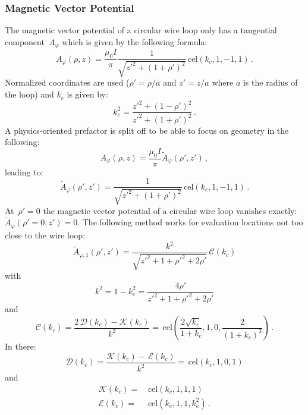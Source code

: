 \subsubsection{Magnetic Vector Potential}
The magnetic vector potential of a circular wire loop
only has a tangential component~$A_\varphi$
which is given by the following formula:
\begin{equation}
  A_\varphi(\rho, z)
  = \frac{\mu_0 I}{\pi} \frac{1}{\sqrt{z'^2 + (1 + \rho')^2}}
    \,\mathrm{cel}(k_c, 1, -1, 1) \, .
\end{equation}
Normalized coordinates are used ($\rho' = \rho/a$ and $z' = z/a$ where $a$ is the radius of the loop)
and $k_c$ is given by:
\begin{equation}
  k_c^2 = \frac{z'^2 + (1 - \rho')^2}{z'^2 + (1 + \rho')^2} \, .
\end{equation}
A physics-oriented prefactor is split off to be able to focus on geometry in the following:
\begin{equation}
  A_\varphi(\rho, z) = \frac{\mu_0 I}{\pi} \tilde{A}_\varphi(\rho',z') \, ,
\end{equation}
leading to:
\begin{equation}
  \tilde{A}_\varphi(\rho',z')
  = \frac{1}{\sqrt{z'^2 + (1 + \rho')^2}} \,\mathrm{cel}(k_c, 1, -1, 1) \, .
\end{equation}
At~$\rho'=0$ the magnetic vector potential of a circular wire loop vanishes exactly:~$\tilde{A}_\varphi(\rho'=0,z') = 0$.
The following method works for evaluation locations not too close to the wire loop:
\begin{equation}
  \tilde{A}_{\varphi,1} (\rho',z')
  = \frac{k^2}{\sqrt{{z'}^2 + 1 + {\rho'}^2 + 2 \rho'}} \,\mathcal{C}(k_c)
\end{equation}
with
\begin{equation}
  k^2 = 1 - k_c^2 = \frac{4 \rho'}{{z'}^2 + 1 + {\rho'}^2 + 2 \rho'}
\end{equation}
and
\begin{equation}
  \mathcal{C}(k_c)
  = \frac{2 \,\mathcal{D}(k_c) - \mathcal{K}(k_c)}{k^2}
  = \,\mathrm{cel} \left( \frac{2 \sqrt{k_c}}{1 + k_c}, 1, 0, \frac{2}{(1 + k_c)^3} \right) \, . \label{eqn:elliptic_c}
\end{equation}
In there:
\begin{equation}
  \mathcal{D}(k_c)
  = \frac{\mathcal{K}(k_c) - \,\mathcal{E}(k_c)}{k^2}
  = \,\mathrm{cel}(k_c, 1, 0, 1) \label{eqn:elliptic_d}
\end{equation}
and
\begin{align}
  \mathcal{K}(k_c) =&\, \mathrm{cel}(k_c, 1, 1, 1)          \label{eqn:elliptic_k} \\
  \mathcal{E}(k_c) =&\, \mathrm{cel}(k_c, 1, 1, k_c^2) \, . \label{eqn:elliptic_e}
\end{align}
